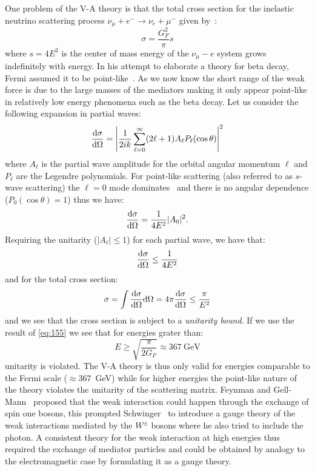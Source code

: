 One problem of the V-A theory is that the total cross section for the inelastic
neutrino scattering process $\nu_\mu + e^- \rightarrow \nu_e + \mu^-$ given
by~\cite{VAUnitaryViolationBook}:
\begin{equation}
  \label{eq:155}
  \sigma = \frac{G_F^2}{\pi}s
\end{equation}
where $s = 4E^2$ is the center of mass energy of the $\nu_\mu-e$ system grows
indefinitely with energy. In his attempt to elaborate a theory for beta decay,
Fermi assumed it to be point-like~\cite{FermiTheoryIta}.  As we now know the
short range of the weak force is due to the large masses of the mediators making
it only appear point-like in relatively low energy phenomena such as the beta
decay. Let us consider the following expansion in partial waves:
\begin{equation}
  \label{eq:156}
  \frac{\mathrm{d} \sigma}{\mathrm{d} \Omega} = \left| \frac{1}{2ik} \sum_{\ell = 0}^\infty
    (2 \ell + 1) A_\ell P_\ell(\cos \theta) \right|^2
\end{equation}
where $A_\ell$ is the partial wave amplitude for the orbital angular momentum
$\ell$ and $P_\ell$ are the Legendre polynomials. For point-like scattering
(also referred to as $s$-wave scattering) the $\ell = 0$ mode
dominates~\cite{VAUnitaryViolationBook} and there is no angular dependence
($P_0(\cos \theta) = 1$) thus we have:
\begin{equation}
  \label{eq:157}
  \frac{\mathrm{d} \sigma}{\mathrm{d} \Omega} = \frac{1}{4E^2} |A_0|^2.
\end{equation}
Requiring the unitarity ($|A_\ell| \leq 1$) for each partial wave, we have that:
\begin{equation}
  \label{eq:158}
  \frac{\mathrm{d} \sigma}{\mathrm{d} \Omega} \leq \frac{1}{4 E^2}
\end{equation}
and for the total cross section:
\begin{equation}
  \label{eq:159}
  \sigma = \int \frac{\mathrm{d} \sigma}{\mathrm{d} \Omega} \mathrm{d} \Omega = 4 \pi \frac{\mathrm{d}
    \sigma}{\mathrm{d} \Omega} \leq \frac{\pi}{E^2}
\end{equation}
and we see that the cross section is subject to a \emph{unitarity bound}. If we
use the result of \cref{eq:155} we see that for energies grater than:
\begin{equation}
  \label{eq:160}
  E \geq \sqrt{\frac{\pi}{2 G_F}} \approx 367~\mathrm{GeV}
\end{equation}
unitarity is violated. The V-A theory is thus only valid for energies comparable
to the Fermi scale ($\approx 367$~GeV) while for higher energies the point-like
nature of the theory violates the unitarity of the scattering matrix. Feynman
and Gell-Mann~\cite{FeynmannGellManFermiInteraction} proposed that the weak
interaction could happen through the exchange of spin one bosons, this prompted
Schwinger~\cite{SchwingerGaugeTheory} to introduce a gauge theory of the weak
interactions mediated by the $W^\pm$ bosons where he also tried to include the
photon. A consistent theory for the weak interaction at high energies thus
required the exchange of mediator particles and could be obtained by analogy to
the electromagnetic case by formulating it as a gauge theory.

